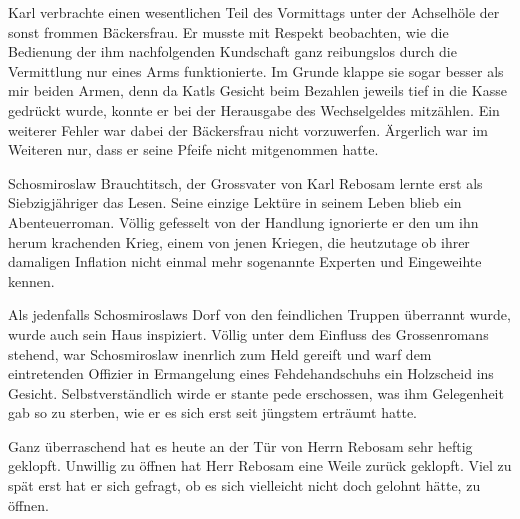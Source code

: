 Karl verbrachte einen wesentlichen Teil des Vormittags unter der Achselhöle der sonst frommen Bäckersfrau. Er musste mit Respekt beobachten, wie die Bedienung der ihm nachfolgenden Kundschaft ganz reibungslos durch die Vermittlung nur eines Arms funktionierte. Im Grunde klappe sie sogar besser als mir beiden Armen, denn da Katls Gesicht beim Bezahlen jeweils tief in die Kasse gedrückt wurde, konnte er bei der Herausgabe des Wechselgeldes mitzählen. Ein weiterer Fehler war dabei der Bäckersfrau nicht vorzuwerfen. Ärgerlich war im Weiteren nur, dass er seine Pfeife nicht mitgenommen hatte.
\begin{center}
{\huge \textthing}
\end{center}
Schosmiroslaw Brauchtitsch, der Grossvater von Karl Rebosam lernte erst als Siebzigjähriger das Lesen. Seine einzige Lektüre in seinem Leben blieb ein Abenteuerroman. Völlig gefesselt von der Handlung ignorierte er den um ihn herum krachenden Krieg, einem von jenen Kriegen, die heutzutage ob ihrer damaligen Inflation nicht einmal mehr sogenannte Experten und Eingeweihte kennen. 

Als jedenfalls Schosmiroslaws Dorf von den feindlichen Truppen überrannt wurde, wurde auch sein Haus inspiziert. Völlig unter dem Einfluss des Grossenromans stehend, war Schosmiroslaw inenrlich zum Held gereift und warf dem eintretenden Offizier in Ermangelung eines Fehdehandschuhs ein Holzscheid ins Gesicht. Selbstverständlich wirde er stante pede erschossen, was ihm Gelegenheit gab so zu sterben, wie er es sich erst seit jüngstem erträumt hatte.
\begin{center}
{\huge \textthing}
\end{center}
Ganz überraschend hat es heute an der Tür von Herrn Rebosam sehr heftig geklopft. Unwillig zu öffnen hat Herr Rebosam eine Weile zurück geklopft. Viel zu spät erst hat er sich gefragt, ob es sich vielleicht nicht doch gelohnt hätte, zu öffnen.
\hfill {\color{red}\decofourleft}

